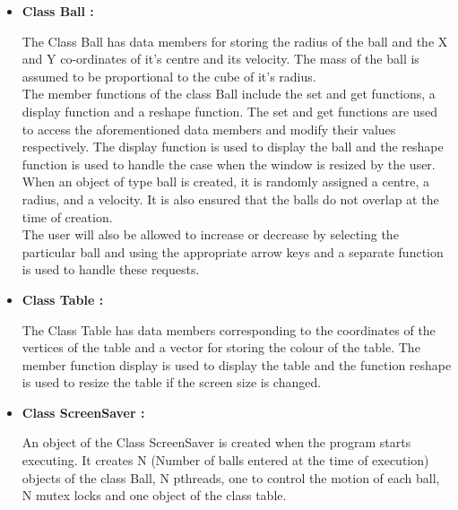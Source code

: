 \documentclass[]{article}
\begin{document}
\begin{itemize}

\item \textbf{Class Ball :}

\begin{flushleft}

The Class Ball has data members for storing the radius of the ball and the X and Y co-ordinates of it's centre and its velocity. The mass of the ball is assumed to be proportional to the cube of it's radius. 
\\
The member functions of the class Ball include the set and get functions, a display function and a reshape function. The set and get functions are used to access the aforementioned data members and modify their values respectively. The display function is used to display the ball and the reshape function is used to handle the case when the window is resized by the user.
\\ 
When an object of type ball is created, it is randomly assigned a centre, a radius, and a velocity. It is also ensured that the balls do not overlap at the time of creation.
\\
The user will also be allowed to increase or decrease by selecting the particular ball and using the appropriate arrow keys and a separate function is used to handle these requests. 
\end{flushleft}


\item \textbf{Class Table :}

\begin{flushleft}

The Class Table has data members corresponding to the coordinates of the vertices of the table and a vector for storing the colour of the table. The member function display is used to display the table and the function reshape is used to resize the table if the screen size is changed.  

\end{flushleft}


\item \textbf{Class ScreenSaver :}

\begin{flushleft}

An object of the Class ScreenSaver is created when the program starts executing. It creates N (Number of balls entered at the time of execution) objects of the class Ball, N pthreads, one to control the motion of each ball, N mutex locks and one object of the class table. \\


\end{flushleft}
\end{itemize}
\end{document}
